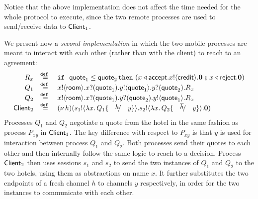 \begin{example}
Notice that	the above implementation does not affect
the time needed for the whole protocol to execute,
since the two remote processes are used
to send/receive data to $\mathsf{Client}_1$.

We present now a \emph{second  implementation}
in which the two mobile processes are meant 
to interact with each other (rather than with the client) to reach to an agreement:
%
\[
	\begin{array}{rcl}
	    R_x & \defeq & \If\ \Quote_1 \leq \Quote_2 \, \Then  (\bsel{x}{\accept} \bout{x}{\creditc} \inact \  \Else \ \bsel{x}{\reject} \inact) \\
		Q_1 &\defeq&	\bout{x}{\rtype} \binp{x}{\Quote_1} \bout{y}{\Quote_1} \binp{y}{\Quote_2} R_x \\
		Q_2 &\defeq&	\bout{x}{\rtype} \binp{x}{\Quote_1} \binp{y}{\Quote_2} \bout{y}{\Quote_1} R_x \\
		\Client_2 &\defeq& \newsp{h}{\bout{s_1}{\abs{x}{Q_1 \subst{h}{y}}} \bout{s_2}{\abs{x}{Q_2 \subst{\dual{h}}{y}}} \inact}
	\end{array}
\]
Processes $Q_1$ and $Q_2$  negotiate a quote from the
		hotel in the same fashion as process $P_{xy}$ in $\mathsf{Client}_1$.
		The key difference with respect to $P_{xy}$ is that $y$ is used for
		interaction between process $Q_1$ and $Q_2$. Both processes send
		their quotes to each other and then internally follow the same
		logic to reach to a decision.
		Process  $\mathsf{Client}_2$ then uses sessions $s_1$ and $s_2$ to send the two
		instances of $Q_1$ and $Q_2$ to the two hotels, using them 
	 as abstractions
		on name $x$. It further substitutes
		the two endpoints of a fresh channel $h$ to channels $y$ respectively,
		in order for the two instances to communicate with each other.




\end{example}

